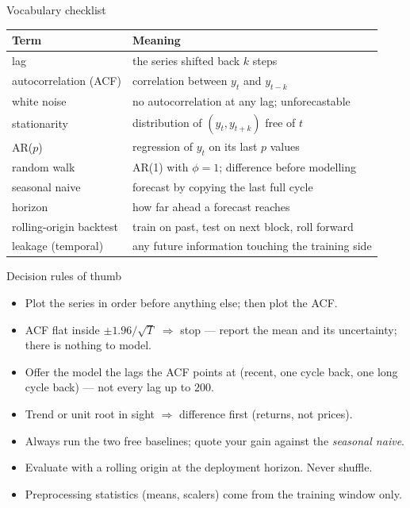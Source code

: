 \documentclass[aspectratio=169,11pt]{beamer}
\begin{document}
\begin{frame}{Vocabulary checklist}
  \footnotesize
  \begin{center}
  \begin{tabular}{@{}ll@{}}
    \toprule
    \textbf{Term} & \textbf{Meaning} \\
    \midrule
    lag & the series shifted back $k$ steps \\
    autocorrelation (ACF) & correlation between $y_t$ and $y_{t-k}$ \\
    white noise & no autocorrelation at any lag; unforecastable \\
    stationarity & distribution of $(y_t, y_{t+k})$ free of $t$ \\
    AR($p$) & regression of $y_t$ on its last $p$ values \\
    random walk & AR(1) with $\phi = 1$; difference before modelling \\
    seasonal naive & forecast by copying the last full cycle \\
    horizon & how far ahead a forecast reaches \\
    rolling-origin backtest & train on past, test on next block, roll forward \\
    leakage (temporal) & any future information touching the training side \\
    \bottomrule
  \end{tabular}
  \end{center}
\end{frame}

\begin{frame}{Decision rules of thumb}
  \begin{itemize}
    \item Plot the series in order before anything else; then plot the ACF.
    \item ACF flat inside $\pm 1.96/\sqrt{T}$ $\Rightarrow$ stop --- report the
          mean and its uncertainty; there is nothing to model.
    \item Offer the model the lags the ACF points at (recent, one cycle back, one
          long cycle back) --- not every lag up to $200$.
    \item Trend or unit root in sight $\Rightarrow$ difference first (returns, not
          prices).
    \item Always run the two free baselines; quote your gain against the
          \emph{seasonal naive}.
    \item Evaluate with a rolling origin at the deployment horizon. Never shuffle.
    \item Preprocessing statistics (means, scalers) come from the training window
          only.
  \end{itemize}
\end{frame}
\end{document}

